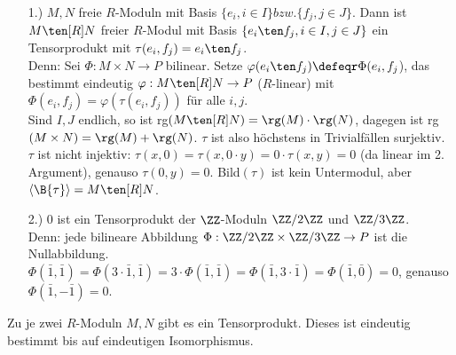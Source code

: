\begin{nnBsp}
  \begin{enumerate}
    \item[1.)] $M, N$ freie $R$-Moduln mit Basis $\{e_i, i \in I\} bzw. \{f_j, j
               \in J\}$. Dann ist $M \ten[R] N$ freier $R$-Modul mit Basis
               $\{e_i\ten f_j, i \in I, j \in J\}$ ein Tensorprodukt mit
               $\tau(e_i,f_j) = e_i\ten f_j$.\\
               Denn: Sei $\Phi: M \times N \to P$ bilinear. Setze
               $\varphi(e_i \ten f_j) \defeqr \Phi(e_i,f_j$), das bestimmt eindeutig
               $\varphi: M \ten[R] N \to P$ ($R$-linear) mit $\Phi(e_i,f_j) =
               \varphi(\tau(e_i,f_j))$ für alle $i,j$.\\
               Sind $I, J$ endlich, so ist rg$(M \ten[R] N) = \rg(M) \cdot
               \rg(N)$, dagegen ist rg$(M \times N) = \rg(M) +
               \rg(N)$. $\tau$ ist also höchstens in Trivialfällen
               surjektiv. $\tau$ ist nicht injektiv: $\tau(x,0) = \tau(x,0 \cdot
               y) = 0 \cdot \tau(x,y) = 0$ (da linear im 2. Argument), genauso
               $\tau(0,y) = 0$. Bild$(\tau)$ ist kein Untermodul, aber $\langle
               \B{\tau} \rangle = M \ten[R] N$.
    \item[2.)] $0$ ist ein Tensorprodukt der $\ZZ$-Moduln
               $\ZZ/2\ZZ$ und $\ZZ/3\ZZ$.\\
               Denn: jede bilineare Abbildung $\Phi: \ZZ/2\ZZ
               \times \ZZ/3\ZZ \to P$ ist die Nullabbildung.
               $\Phi(\bar{1},\bar{1}) = \Phi(3 \cdot \bar{1},\bar{1}) = 3 \cdot
               \Phi(\bar{1},\bar{1}) = \Phi(\bar{1},3 \cdot \bar{1}) =
               \Phi(\bar{1},\bar{0})= 0$, genauso $\Phi(\bar{1},-\bar{1}) = 0$.
  \end{enumerate}
\end{nnBsp}

\begin{Satz}
  Zu je zwei $R$-Moduln $M,N$ gibt es ein Tensorprodukt. Dieses ist eindeutig
  bestimmt bis auf eindeutigen Isomorphismus.
\end{Satz}

